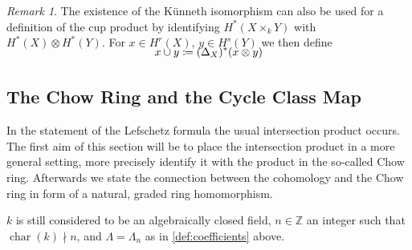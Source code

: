 \documentclass[english,headsepline=0.25pt]{scrartcl}
\theoremstyle{definition}
\theoremstyle{remark}
\newtheorem{Rem}[Def]{Remark}
\newcommand*{\Z}{\mathds{Z}}
\DeclareMathOperator{\Char}{char} %
\newcommand*{\Diag}[1]{{\Delta_{#1}}} %
\begin{document}
\begin{Rem}\label{rem:cupwithkuennethiso}
  The existence of the Künneth isomorphism can also be used for
  a definition of the cup product by identifying $H^*(X\times_k Y)$
  with $H^*(X)\otimes H^*(Y)$. For $x\in H^r(X)$, $y\in H^s(Y)$
  we then define
  \begin{gather*}
    \SwapAboveDisplaySkip
    x\cup y \coloneqq (\Diag{X})^*(x\otimes y)
  \end{gather*}
\end{Rem}

\subsection{The Chow Ring and the Cycle Class Map}
In the statement of the Lefschetz formula the usual intersection
product occurs. The first aim of this section will be to place the
intersection product in a more general setting, more precisely
identify it with the product in the so-called Chow ring. Afterwards we
state the connection between the cohomology and the Chow ring in form
of a natural, graded ring homomorphism.

$k$ is still considered to be an algebraically closed field,
$n\in\Z$ an integer such that $\Char(k)\nmid n$,
and $\Lambda=\Lambda_n$ as in \ref{def:coefficients} above.
\end{document}
